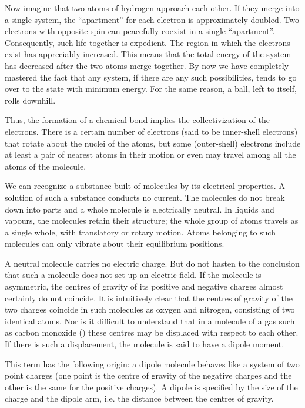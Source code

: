 Now imagine that two atoms of hydrogen approach each other. If they merge into a single system, the ``apartment'' for each electron is approximately doubled. Two
electrons with opposite spin can peacefully coexist in a single ``apartment''. Consequently, such life together is expedient. The region in which the electrons exist has appreciably increased. This means that the total energy of the system has decreased after the two atoms merge together. By now we have completely mastered the fact that any system, if there are any such possibilities, tends to go over to the state with minimum energy. For the same reason, a ball, left to itself, rolls downhill.

Thus, the formation of a chemical bond implies the collectivization of the electrons. There is a certain number of electrons (said to be inner-shell electrons) that rotate about the nuclei of the atoms, but some (outer-shell) electrons include at least a pair of nearest atoms in their motion or even may travel among all the atoms of the molecule.

We can recognize a substance built of molecules by its electrical properties. A solution of such a substance conducts no current. The molecules do not break down into parts and a whole molecule is electrically neutral. In liquids and vapours, the molecules retain their structure; the whole group of atoms travels as a single whole, with translatory or rotary motion. Atoms belonging to such molecules can only vibrate about their equilibrium positions.

A neutral molecule carries no electric charge. But do not hasten to the conclusion that such a molecule does not set up an electric field. If the molecule is asymmetric, the centres of gravity of its positive and negative charges almost certainly do not coincide. It is intuitively clear that the centres of gravity of the two charges coincide in such molecules as oxygen and nitrogen, consisting of two identical atoms. Nor is it difficult to understand that in a molecule of a gas such as carbon monoxide () these centres may be displaced with respect to each other. If there is such a displacement, the molecule is said to have a dipole moment.

This term has the following origin: a dipole molecule behaves like a system of two point charges (one point is the centre of gravity of the negative charges and the other is the same for the positive charges). A dipole is specified by the size of the charge and the dipole arm, i.e. the distance between the centres of gravity.

